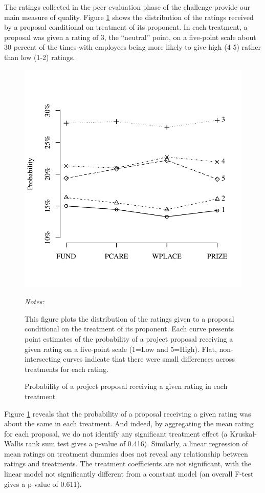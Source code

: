 \documentclass[12pt, titlepage]{article}
\newenvironment{tablenotes}[1][]{
  \begin{minipage}{\textwidth}\emph{Notes:}{\footnotesize #1}
}{\end{minipage}}
\begin{document}
The ratings collected in the peer evaluation phase of the challenge
provide our main measure of quality. Figure \ref{fig: ratings} shows the
distribution of the ratings received by a proposal conditional on
treatment of its proponent. In each treatment, a proposal was given a
rating of 3, the ``neutral'' point, on a five-point scale about 30
percent of the times with employees being more likely to give high (4-5)
rather than low (1-2) ratings.

\begin{figure}
  \centering
  \caption{Probability of a project proposal receiving a given rating in each treatment}
  \label{fig: ratings}
  \includegraphics{figures/plot-ratings-1.pdf}
  \begin{tablenotes}
  This figure plots the distribution of the ratings given to a proposal conditional on the treatment of its proponent. Each curve presents point estimates of the probability of a project proposal receiving a given rating on a five-point scale (1=Low and 5=High). Flat, non-intersecting curves indicate that there were small differences across treatments for each rating.
  \end{tablenotes}
\end{figure}

Figure \ref{fig: ratings} reveals that the probability of a proposal
receiving a given rating was about the same in each treatment. And
indeed, by aggregating the mean rating for each proposal, we do not
identify any significant treatment effect (a Kruskal-Wallis rank sum
test gives a p-value of 0.416). Similarly, a linear regression of mean
ratings on treatment dummies does not reveal any relationship between
ratings and treatments. The treatment coefficients are not significant,
with the linear model not significantly different from a constant model
(an overall F-test gives a p-value of 0.611).
\end{document}
